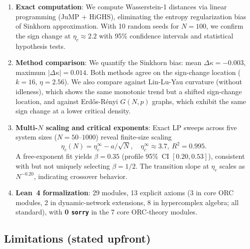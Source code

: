 \documentclass[12pt]{article}
\newcommand{\etac}{\eta_c}
\newcommand{\sorry}{\texttt{sorry}}
\begin{document}
\begin{enumerate}
  \item \textbf{Exact computation}: We compute Wasserstein-1 distances via linear programming
  (JuMP + HiGHS), eliminating the entropy regularization bias of Sinkhorn approximation.
  With 10 random seeds for $N = 100$, we confirm the sign change at $\etac \approx 2.2$
  with 95\% confidence intervals and statistical hypothesis tests.

  \item \textbf{Method comparison}: We quantify the Sinkhorn bias: mean
  $\Delta\kappa = -0.003$, maximum $|\Delta\kappa| = 0.014$. Both methods agree on the
  sign-change location ($k = 16$, $\eta = 2.56$). We also compare against Lin-Lu-Yau
  curvature (without idleness), which shows the same monotonic trend but a shifted
  sign-change location, and against Erd\H{o}s-R\'{e}nyi $G(N,p)$ graphs, which exhibit
  the same sign change at a lower critical density.

  \item \textbf{Multi-$N$ scaling and critical exponents}: Exact LP sweeps across
  five system sizes ($N = 50$--$1000$) reveal finite-size scaling
  \[
    \etac(N) = \etac^\infty - a/\sqrt{N}, \quad \etac^\infty \approx 3.7,\ R^2 = 0.995.
  \]
  A free-exponent fit yields $\beta = 0.35$ (profile 95\%~CI $[0.20, 0.53]$),
  consistent with but not uniquely selecting $\beta = 1/2$. The transition slope at
  $\etac$ scales as $N^{-0.20}$, indicating crossover behavior.

  \item \textbf{Lean~4 formalization}: 29 modules, 13 explicit axioms (3 in core ORC
  modules, 2 in dynamic-network extensions, 8 in hypercomplex algebra; all standard),
  with \textbf{0 \sorry{}} in the 7 core ORC-theory modules.
\end{enumerate}

\subsection{Limitations (stated upfront)}
\end{document}
